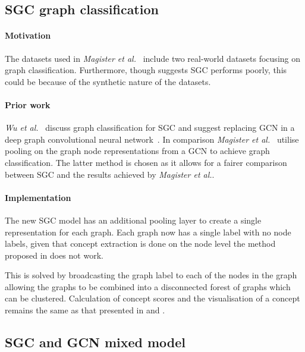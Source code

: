 \subsection{SGC graph classification}
\paragraph{Motivation}
The datasets used in \textit{Magister et al.}~\cite{magister2021gcexplainer} include two real-world datasets focusing on graph classification.
Furthermore, though  suggests SGC performs poorly, this could be because of the synthetic nature of the datasets.

\paragraph{Prior work}
\textit{Wu et al.}~\cite{wu2019simplifying} discuss graph classification for SGC and suggest replacing GCN in a deep graph convolutional neural network~\cite{zhang2018end}.
In comparison \textit{Magister et al.}~\cite{magister2021gcexplainer} utilise pooling on the graph node representations from a GCN to achieve graph classification.
The latter method is chosen as it allows for a fairer comparison between SGC and the results achieved by \textit{Magister et al.}.

\paragraph{Implementation}
The new SGC model has an additional pooling layer to create a single representation for each graph.
Each graph now has a single label with no node labels, given that concept extraction is done on the node level the method proposed in  does not work.

This is solved by broadcasting the graph label to each of the nodes in the graph allowing the graphs to be combined into a disconnected forest of graphs which can be clustered.
Calculation of concept scores and the visualisation of a concept remains the same as that presented in  and .

\subsection{SGC and GCN mixed model}
\label{sec:SGCN}
